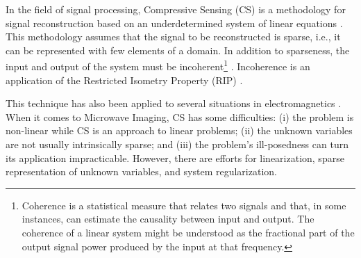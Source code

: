 			In the field of signal processing, Compressive Sensing (CS) is a methodology for signal reconstruction based on an underdetermined system of linear equations \citep{donoho2006compressed}. This methodology assumes that the signal to be reconstructed is sparse, i.e., it can be represented with few elements of a domain. In addition to sparseness, the input and output of the system must be incoherent\footnote{Coherence is a statistical measure that relates two signals and that, in some instances, can estimate the causality between input and output. The coherence of a linear system might be understood as the fractional part of the output signal power produced by the input at that frequency.} \citep{candes2007sparsity}. Incoherence is an application of the Restricted Isometry Property (RIP) \citep{shah2016inverse}.
			
			This technique has also been applied to several situations in electromagnetics \citep{massa2015compressive}. When it comes to Microwave Imaging, CS has some difficulties: (i) the problem is non-linear while CS is an approach to linear problems; (ii) the unknown variables are not usually intrinsically sparse; and (iii) the problem's ill-posedness can turn its application impracticable. However, there are efforts for linearization, sparse representation of unknown variables, and system regularization.
			
